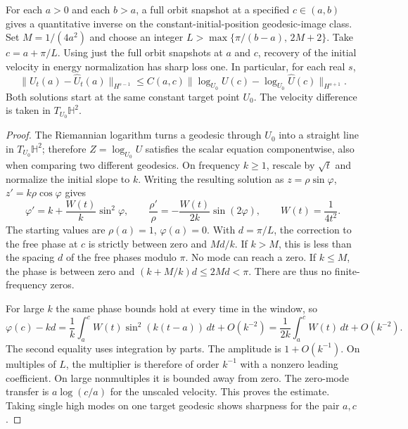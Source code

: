 \begin{proposition}
\label{prop:safe-gap}
For each $a>0$ and each $b>a$, a full orbit snapshot
at a specified $c\in(a,b)$ gives a quantitative
inverse on the constant-initial-position geodesic-image
class. Set $M=1/(4a^2)$ and choose an integer
$L>\max\{\pi/(b-a),\,2M+2\}$.
Take $c=a+\pi/L$.
Using just the full orbit snapshots at $a$ and $c$,
recovery of the initial velocity in energy normalization
has sharp loss one. In particular, for each real $s$,
\[
 \|U_t(a)-\widehat U_t(a)\|_{H^{s-1}}
 \le C(a,c)\|
       \log_{U_0}U(c)-\log_{U_0}\widehat U(c)
      \|_{H^{s+1}} .
\]
Both solutions start at the same constant target point $U_0$.
The velocity difference is taken in $T_{U_0}\mathbb H^2$.
\end{proposition}

\begin{proof}
The Riemannian logarithm turns a geodesic through $U_0$
into a straight line in $T_{U_0}\mathbb H^2$;
therefore $Z=\log_{U_0}U$ satisfies the scalar
equation componentwise, also when comparing two
different geodesics. On frequency $k\ge1$, rescale
by $\sqrt t$ and normalize the initial slope to $k$.
Writing the resulting solution as
$z=\rho\sin\varphi$, $z'=k\rho\cos\varphi$ gives
\[
 \varphi'=k+\frac{W(t)}{k}\sin^2\varphi,\qquad
 \frac{\rho'}{\rho}=-\frac{W(t)}{2k}\sin(2\varphi),
 \qquad W(t)=\frac1{4t^2}.
\]
The starting values are $\rho(a)=1$, $\varphi(a)=0$.
With $d=\pi/L$, the correction to the free phase at $c$
is strictly between zero and $Md/k$. If $k>M$,
this is less than the spacing $d$ of the free phases
modulo $\pi$. No mode can reach a zero. If $k\le M$,
the phase is between zero and $(k+M/k)d\le 2Md<\pi$.
There are thus no finite-frequency zeros.

For large $k$ the same phase bounds hold at every time
in the window, so
\[
 \varphi(c)-kd
 =\frac1k\int_a^c W(t)\sin^2(k(t-a))\,dt+O(k^{-2})
 =\frac1{2k}\int_a^c W(t)\,dt+O(k^{-2}).
\]
The second equality uses integration by parts.
The amplitude is $1+O(k^{-1})$.
On multiples of $L$, the multiplier is therefore of
order $k^{-1}$ with a nonzero leading coefficient.
On large nonmultiples it is bounded away from zero.
The zero-mode transfer is $a\log(c/a)$
for the unscaled velocity. This proves the estimate.
Taking single high modes on one target geodesic shows
sharpness for the pair $a,c$.
\end{proof}
